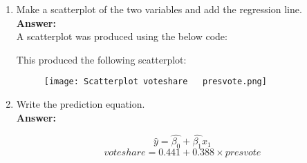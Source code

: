 \documentclass[12pt,letterpaper]{article}
\begin{document}
\begin{enumerate}
		\item Make a scatterplot of the two variables and add the regression line.\\
		
		\textbf{Answer:}\\
		
		A scatterplot was produced using the below code:
		
		\vspace{.5cm}
		
		  
		
		\vspace{.5cm}
		
		This produced the following scatterplot:
		
		\begin{figure}[H]\centering
			\caption{\footnotesize}
			\texttt{[image: Scatterplot voteshare ~ presvote.png]}
		\end{figure} 
		
		\item Write the prediction equation.\\
		
		\textbf{Answer:}
		
		\[\hat{y} = \hat{\beta_0} + \hat{\beta_1}x_1 \]
		\[voteshare = 0.441 + 0.388\times presvote \]
		
	\end{enumerate}
	

\newpage	
\end{document}
